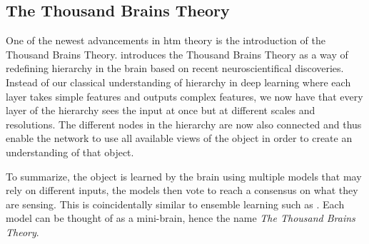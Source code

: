 \subsection{The Thousand Brains Theory}
One of the newest advancements in \gls*{htm} theory is the introduction of the Thousand Brains Theory. \textcite{thousandbrains} introduces the Thousand Brains Theory as a way of redefining hierarchy in the brain based on recent neuroscientifical discoveries. Instead of our classical understanding of hierarchy in deep learning where each layer takes simple features and outputs complex features, we now have that every layer of the hierarchy sees the input at once but at different scales and resolutions. The different nodes in the hierarchy are now also connected and thus enable the network to use all available views of the object in order to create an understanding of that object. \par
To summarize, the object is learned by the brain using multiple models that may rely on different inputs, the models then vote to reach a consensus on what they are sensing. This is coincidentally similar to ensemble learning such as \textcite{divergentNets}. Each model can be thought of as a mini-brain, hence the name \emph{The Thousand Brains Theory}.
